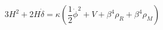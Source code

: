 \begin{equation}\label{einstein11}
3H^2+2H\dot{\delta}=\kappa \left( \frac{1}{2} \dot{\phi}^2 +V +
\beta^4 \rho_R + \beta^4 \rho_M \right)
\end{equation}


